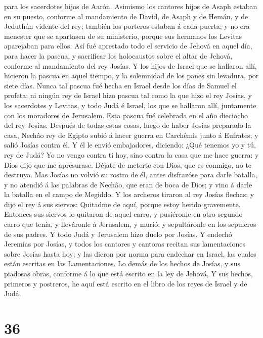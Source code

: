 para los sacerdotes hijos de Aarón.  Asimismo los cantores
hijos de Asaph estaban en su puesto, conforme al mandamiento de David,
de Asaph y de Hemán, y de Jeduthún vidente del rey; también los porteros
estaban á cada puerta; y no era menester que se apartasen de su
ministerio, porque sus hermanos los Levitas aparejaban para ellos.
 Así fué aprestado todo el servicio de Jehová en aquel día,
para hacer la pascua, y sacrificar los holocaustos sobre el altar de
Jehová, conforme al mandamiento del rey Josías.  Y los
hijos de Israel que se hallaron allí, hicieron la pascua en aquel
tiempo, y la solemnidad de los panes sin levadura, por siete días.
 Nunca tal pascua fué hecha en Israel desde los días de
Samuel el profeta; ni ningún rey de Israel hizo pascua tal como la que
hizo el rey Josías, y los sacerdotes y Levitas, y todo Judá é Israel,
los que se hallaron allí, juntamente con los moradores de Jerusalem.
 Esta pascua fué celebrada en el año dieciocho del rey
Josías.  Después de todas estas cosas, luego de haber
Josías preparado la casa, Nechâo rey de Egipto subió á hacer guerra en
Carchêmis junto á Eufrates; y salió Josías contra él.  Y él
le envió embajadores, diciendo: ¿Qué tenemos yo y tú, rey de Judá? Yo no
vengo contra ti hoy, sino contra la casa que me hace guerra: y Dios dijo
que me apresurase. Déjate de meterte con Dios, que es conmigo, no te
destruya.  Mas Josías no volvió su rostro de él, antes
disfrazóse para darle batalla, y no atendió á las palabras de Nechâo,
que eran de boca de Dios; y vino á darle la batalla en el campo de
Megiddo.  Y los archeros tiraron al rey Josías flechas; y
dijo el rey á sus siervos: Quitadme de aquí, porque estoy herido
gravemente.  Entonces sus siervos lo quitaron de aquel
carro, y pusiéronle en otro segundo carro que tenía, y lleváronle á
Jerusalem, y murió; y sepultáronle en los sepulcros de sus padres. Y
todo Judá y Jerusalem hizo duelo por Josías.  Y endechó
Jeremías por Josías, y todos los cantores y cantoras recitan sus
lamentaciones sobre Josías hasta hoy; y las dieron por norma para
endechar en Israel, las cuales están escritas en las Lamentaciones.
 Lo demás de los hechos de Josías, y sus piadosas obras,
conforme á lo que está escrito en la ley de Jehová,  Y sus
hechos, primeros y postreros, he aquí está escrito en el libro de los
reyes de Israel y de Judá.

\hypertarget{section-35}{%
\section{36}\label{section-35}}

